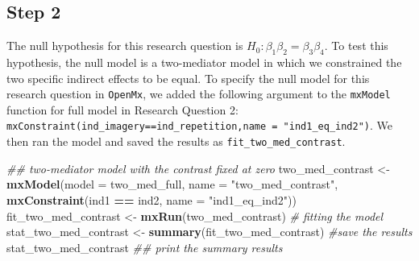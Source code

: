 \documentclass[11pt,]{article}
\newenvironment{Shaded}{\begin{snugshade}}{\end{snugshade}}
\newcommand{\CommentTok}[1]{\textcolor[rgb]{0.56,0.35,0.01}{\textit{#1}}}
\newcommand{\DataTypeTok}[1]{\textcolor[rgb]{0.13,0.29,0.53}{#1}}
\newcommand{\KeywordTok}[1]{\textcolor[rgb]{0.13,0.29,0.53}{\textbf{#1}}}
\newcommand{\NormalTok}[1]{#1}
\newcommand{\OperatorTok}[1]{\textcolor[rgb]{0.81,0.36,0.00}{\textbf{#1}}}
\newcommand{\StringTok}[1]{\textcolor[rgb]{0.31,0.60,0.02}{#1}}
\begin{document}
\hypertarget{step-2-2}{%
\subsection{Step 2}\label{step-2-2}}

The null hypothesis for this research question is
\(H_0: \beta_1 \beta_2 = \beta_3 \beta_4\). To test this hypothesis, the
null model is a two-mediator model in which we constrained the two
specific indirect effects to be equal. To specify the null model for
this research question in \texttt{OpenMx}, we added the following
argument to the \texttt{mxModel} function for full model in Research
Question 2:
\texttt{mxConstraint(ind\_imagery==ind\_repetition,name\ =\ "ind1\_eq\_ind2")}.
We then ran the model and saved the results as
\texttt{fit\_two\_med\_contrast}.

\begin{Shaded}
\begin{Highlighting}[]
\CommentTok{## two-mediator model with the contrast fixed at zero}
\NormalTok{two_med_contrast <-}\StringTok{ }\KeywordTok{mxModel}\NormalTok{(}\DataTypeTok{model =}\NormalTok{ two_med_full,}
                            \DataTypeTok{name =} \StringTok{"two_med_contrast"}\NormalTok{,}
                            \KeywordTok{mxConstraint}\NormalTok{(ind1 }\OperatorTok{==}\StringTok{ }\NormalTok{ind2, }\DataTypeTok{name =} \StringTok{"ind1_eq_ind2"}\NormalTok{))}
\NormalTok{fit_two_med_contrast <-}\StringTok{ }\KeywordTok{mxRun}\NormalTok{(two_med_contrast) }\CommentTok{# fitting the model}
\NormalTok{stat_two_med_contrast <-}
\StringTok{  }\KeywordTok{summary}\NormalTok{(fit_two_med_contrast) }\CommentTok{#save the results}
\NormalTok{stat_two_med_contrast }\CommentTok{## print the summary results}
\end{Highlighting}
\end{Shaded}
\end{document}
